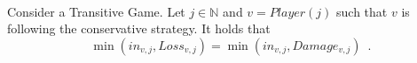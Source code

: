 \begin{lemma} \ \\
   Consider a Transitive Game. Let $j \in \mathbb{N}$ and $v = Player\left(j\right)$ such that $v$ is following the
   conservative strategy. It holds that
   \begin{equation*}
      \min\left(in_{v, j}, Loss_{v, j}\right) = \min\left(in_{v, j}, Damage_{v, j}\right) \enspace.
   \end{equation*}
\end{lemma}
